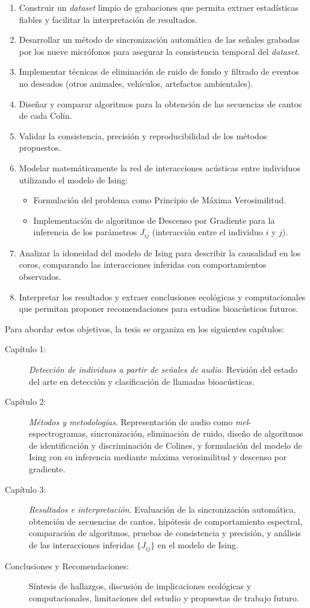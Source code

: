 \begin{enumerate}
  \item Construir un \emph{dataset} limpio de grabaciones que permita extraer estadísticas fiables y facilitar la interpretación de resultados.
  \item Desarrollar un método de sincronización automática de las señales grabadas por los nueve micrófonos para asegurar la consistencia temporal del \emph{dataset}.
  \item Implementar técnicas de eliminación de ruido de fondo y filtrado de eventos no deseados (otros animales, vehículos, artefactos ambientales).
  \item Diseñar y comparar algoritmos para la obtención de las secuencias de cantos de cada Colín.
  \item Validar la consistencia, precisión y reproducibilidad de los métodos propuestos.
  \item Modelar matemáticamente la red de interacciones acústicas entre individuos utilizando el modelo de Ising:
    \begin{itemize}
      \item Formulación del problema como Principio de Máxima Verosimilitud.
      \item Implementación de algoritmos de Descenso por Gradiente para la inferencia de los parámetros \(J_{ij}\) (interacción entre el individuo $i$ y $j$).
    \end{itemize}
  \item Analizar la idoneidad del modelo de Ising para describir la causalidad en los coros, comparando las interacciones inferidas con comportamientos observados.
  \item Interpretar los resultados y extraer conclusiones ecológicas y computacionales que permitan proponer recomendaciones para estudios bioacústicos futuros.
\end{enumerate}

Para abordar estos objetivos, la tesis se organiza en los siguientes capítulos:
\begin{description}
  \item[Capítulo 1:] \emph{Detección de individuos a partir de señales de audio}. Revisión del estado del arte en detección y clasificación de llamadas bioacústicas.
  \item[Capítulo 2:] \emph{Métodos y metodologías}. Representación de audio como \emph{mel}-espectrogramas, sincronización, eliminación de ruido, diseño de algoritmos de identificación y discriminación de Colines, y formulación del modelo de Ising con su inferencia mediante máxima verosimilitud y descenso por gradiente.
  \item[Capítulo 3:] \emph{Resultados e interpretación}. Evaluación de la sincronización automática, obtención de secuencias de cantos, hipótesis de comportamiento espectral, comparación de algoritmos, pruebas de consistencia y precisión, y análisis de las interacciones inferidas \(\{J_{ij}\}\) en el modelo de Ising.
  \item[Conclusiones y Recomendaciones:] Síntesis de hallazgos, discusión de implicaciones ecológicas y computacionales, limitaciones del estudio y propuestas de trabajo futuro.
\end{description}


